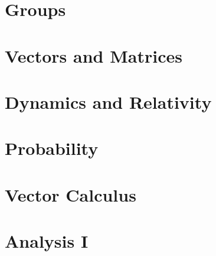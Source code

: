 \documentclass{book}
\begin{document}
\chapter{Groups}

\chapter{Vectors and Matrices}

\chapter{Dynamics and Relativity}

\chapter{Probability}

\chapter{Vector Calculus}

\chapter{Analysis I}

\end{document}

